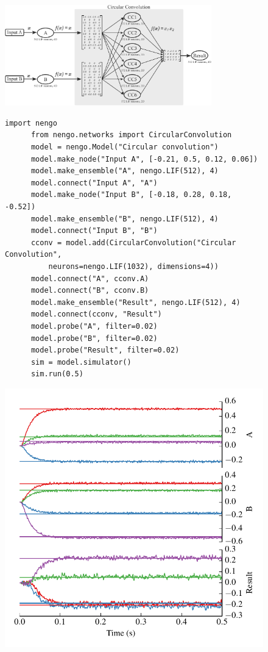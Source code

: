 \documentclass{frontiersSCNS}
\begin{document}
\begin{figure}
\begin{center}
  \includegraphics[width=0.8\textwidth]{cconv}
  \begin{minipage}{0.53\textwidth}
    \begin{lstlisting}[basicstyle={\footnotesize\ttfamily}]
      import nengo
      from nengo.networks import CircularConvolution
      model = nengo.Model("Circular convolution")
      model.make_node("Input A", [-0.21, 0.5, 0.12, 0.06])
      model.make_ensemble("A", nengo.LIF(512), 4)
      model.connect("Input A", "A")
      model.make_node("Input B", [-0.18, 0.28, 0.18, -0.52])
      model.make_ensemble("B", nengo.LIF(512), 4)
      model.connect("Input B", "B")
      cconv = model.add(CircularConvolution("Circular Convolution",
          neurons=nengo.LIF(1032), dimensions=4))
      model.connect("A", cconv.A)
      model.connect("B", cconv.B)
      model.make_ensemble("Result", nengo.LIF(512), 4)
      model.connect(cconv, "Result")
      model.probe("A", filter=0.02)
      model.probe("B", filter=0.02)
      model.probe("Result", filter=0.02)
      sim = model.simulator()
      sim.run(0.5)
    \end{lstlisting}
  \end{minipage}
  \begin{minipage}{0.43\textwidth}
    \includegraphics[width=\textwidth]{cconv_res}

\end{minipage}
\end{center}
\end{figure}
\end{document}
